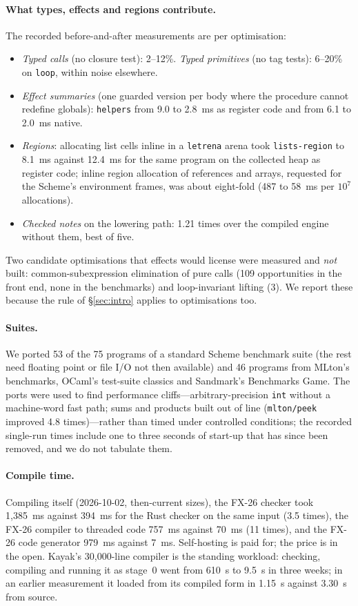 \documentclass[acmsmall,screen,review]{acmart}
\newcommand{\cd}[1]{\texttt{#1}}
\newcommand{\fx}{FX-26}
\begin{document}
\paragraph{What types, effects and regions contribute.} The recorded
before-and-after measurements are per optimisation:
\begin{itemize}
\item \emph{Typed calls} (no closure test): 2--12\%.
  \emph{Typed primitives} (no tag tests): 6--20\% on \cd{loop},
  within noise elsewhere.
\item \emph{Effect summaries} (one guarded version per body where the
  procedure cannot redefine globals): \cd{helpers} from 9.0 to 2.8~ms
  as register code and from 6.1 to 2.0~ms native.
\item \emph{Regions}: allocating list cells inline in a \cd{letrena}
  arena took \cd{lists-region} to 8.1~ms against 12.4~ms for the same
  program on the collected heap as register code; inline region
  allocation of references and arrays, requested for the Scheme's
  environment frames, was about eight-fold (487 to 58~ms per $10^7$
  allocations).
\item \emph{Checked notes} on the lowering path: 1.21 times over the
  compiled engine without them, best of five.
\end{itemize}
Two candidate optimisations that effects would license were measured
and \emph{not} built: common-subexpression elimination of pure calls
(109 opportunities in the front end, none in the benchmarks) and
loop-invariant lifting (3). We report these because the rule of
\S\ref{sec:intro} applies to optimisations too.

\paragraph{Suites.} We ported 53 of the 75 programs of a standard Scheme benchmark suite (the rest need floating point or file I/O not then
available) and 46 programs from MLton's benchmarks, OCaml's test-suite
classics and Sandmark's Benchmarks Game. The ports were used to
find performance cliffs---arbitrary-precision \cd{int} without a machine-word fast path;
sums and products built out of line (\cd{mlton/peek} improved 4.8
times)---rather than timed under controlled conditions; the recorded
single-run times include one to three seconds of start-up that has
since been removed, and we do not tabulate them.

\paragraph{Compile time.} Compiling itself (2026-10-02, then-current
sizes), the \fx{} checker took 1,385~ms against 394~ms for the Rust
checker on the same input (3.5 times), the \fx{} compiler to threaded code 757~ms against 70~ms (11 times), and the \fx{} code generator
979~ms against 7~ms. Self-hosting is paid for; the price is in the
open. Kayak's 30,000-line compiler is the standing workload: checking,
compiling and running it as stage~0 went from 610~s to 9.5~s in three
weeks; in an earlier measurement it loaded from its compiled form in
1.15~s against 3.30~s from source.
\end{document}
